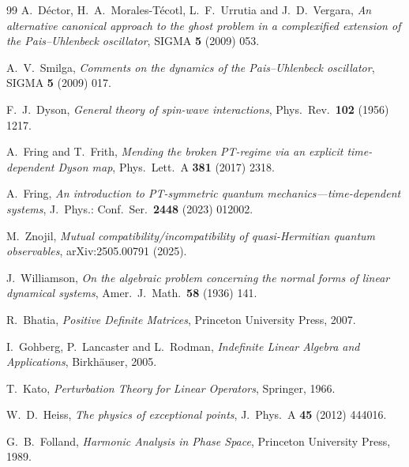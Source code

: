 \documentclass[11pt]{article}
\theoremstyle{definition}
\theoremstyle{remark}
\begin{document}
\begin{thebibliography}{99}
A.~D\'ector, H.~A.~Morales-T\'ecotl, L.~F.~Urrutia and J.~D.~Vergara,
\emph{An alternative canonical approach to the ghost problem in a complexified
extension of the Pais--Uhlenbeck oscillator},
SIGMA \textbf{5} (2009) 053.

A.~V.~Smilga,
\emph{Comments on the dynamics of the Pais--Uhlenbeck oscillator},
SIGMA \textbf{5} (2009) 017.

F.~J.~Dyson,
\emph{General theory of spin-wave interactions},
Phys.\ Rev.\ \textbf{102} (1956) 1217.

A.~Fring and T.~Frith,
\emph{Mending the broken PT-regime via an explicit time-dependent Dyson map},
Phys.\ Lett.\ A \textbf{381} (2017) 2318.

A.~Fring,
\emph{An introduction to PT-symmetric quantum mechanics---time-dependent
systems},
J.\ Phys.: Conf.\ Ser.\ \textbf{2448} (2023) 012002.

M.~Znojil,
\emph{Mutual compatibility/incompatibility of quasi-Hermitian quantum
observables},
arXiv:2505.00791 (2025).

J.~Williamson,
\emph{On the algebraic problem concerning the normal forms of linear
dynamical systems},
Amer.\ J.\ Math.\ \textbf{58} (1936) 141.

R.~Bhatia,
\emph{Positive Definite Matrices},
Princeton University Press, 2007.

I.~Gohberg, P.~Lancaster and L.~Rodman,
\emph{Indefinite Linear Algebra and Applications},
Birkh\"auser, 2005.

T.~Kato,
\emph{Perturbation Theory for Linear Operators},
Springer, 1966.

W.~D.~Heiss,
\emph{The physics of exceptional points},
J.\ Phys.\ A \textbf{45} (2012) 444016.

G.~B.~Folland,
\emph{Harmonic Analysis in Phase Space},
Princeton University Press, 1989.

\end{thebibliography}
\end{document}
